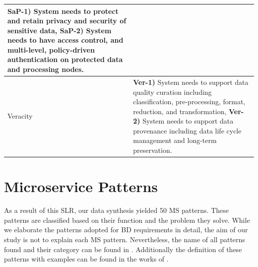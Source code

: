 \documentclass[a4paper,11pt,article,oneside]{memoir}
\begin{document}
\begin{table}[h]
\begin{tabular}{|m{1.2cm}|m{14cm}|}
        \textbf{SaP-1)} System needs to protect and retain privacy and security of sensitive data, \textbf{SaP-2)} System needs to have access control, and multi-level, policy-driven authentication on protected data and processing nodes. 
        \\

        \hline
        
        Veracity &
        
        \textbf{Ver-1)} System needs to support data quality curation including classification, pre-processing, format, reduction, and  transformation, \textbf{Ver-2)} System needs to support data provenance including data life cycle management and long-term preservation.
        \\
        \hline
  
    \end{tabular}
    \label{table-requirements}
    \end{table}


\section{Microservice Patterns}

As a result of this SLR, our data synthesis yielded 50 MS patterns. These patterns are classified based on their function and the problem they solve. While we elaborate the patterns adopted for BD requirements in detail, the aim of our study is not to explain each MS pattern. Nevertheless, the name of all patterns found and their category can be found in \citet{MSPatterns}. Additionally the definition of these patterns with examples can be found in the works of \citet{richardson2018microservices}.

  


 


 
\end{document}
